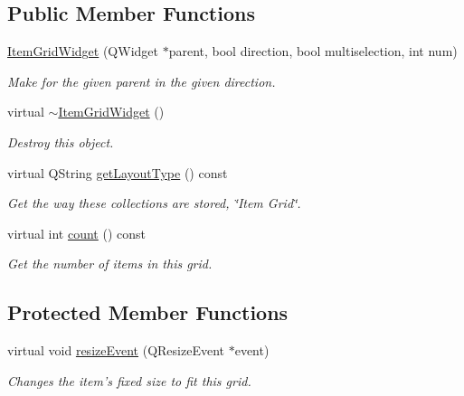 \subsection*{Public Member Functions}
\begin{DoxyCompactItemize}
\item 
\hyperlink{class_u_i_1_1_item_grid_widget_a5ce59c4521e874c14a5f80f253c100d0}{Item\-Grid\-Widget} (Q\-Widget $\ast$parent, bool direction, bool multiselection, int num)
\begin{DoxyCompactList}\small\item\em Make for the given parent in the given direction. \end{DoxyCompactList}\item 
\hypertarget{class_u_i_1_1_item_grid_widget_acab759affc5d6c6b5cc213b73ea4cda7}{virtual \hyperlink{class_u_i_1_1_item_grid_widget_acab759affc5d6c6b5cc213b73ea4cda7}{$\sim$\-Item\-Grid\-Widget} ()}\label{class_u_i_1_1_item_grid_widget_acab759affc5d6c6b5cc213b73ea4cda7}

\begin{DoxyCompactList}\small\item\em Destroy this object. \end{DoxyCompactList}\item 
virtual Q\-String \hyperlink{class_u_i_1_1_item_grid_widget_aa9d31787c89f122f0916c86bfa188d12}{get\-Layout\-Type} () const 
\begin{DoxyCompactList}\small\item\em Get the way these collections are stored, \char`\"{}\-Item Grid\char`\"{}. \end{DoxyCompactList}\item 
virtual int \hyperlink{class_u_i_1_1_item_grid_widget_af041bee8f281597d214ef12e4d8494a4}{count} () const 
\begin{DoxyCompactList}\small\item\em Get the number of items in this grid. \end{DoxyCompactList}\end{DoxyCompactItemize}
\subsection*{Protected Member Functions}
\begin{DoxyCompactItemize}
\item 
virtual void \hyperlink{class_u_i_1_1_item_grid_widget_ac67d14ce2ecd0d77f2f02245045250eb}{resize\-Event} (Q\-Resize\-Event $\ast$event)
\begin{DoxyCompactList}\small\item\em Changes the item's fixed size to fit this grid. \end{DoxyCompactList}\end{DoxyCompactItemize}
